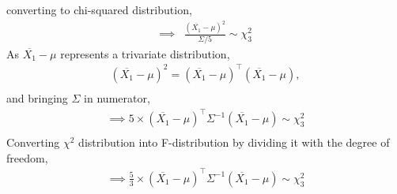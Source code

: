 \documentclass[journal,12pt,twocolumn]{IEEEtran}
\theoremstyle{remark}
\begin{document}
converting to chi-squared distribution,
\begin{align}
	\implies &\frac{(\overline{X_1} - \mu)^2}{\Sigma/5} \sim \chi^2_3
\end{align}
As $\overline{X_1}-\mu$ represents a trivariate distribution, 
\begin{align}
	(\overline{X_1}-\mu)^2 = (\overline{X_1}-\mu)^{\top}(\overline{X_1}-\mu),\\
\end{align}
and bringing $\Sigma$ in numerator,
\begin{align}
	\implies 5 \times (\overline{X_1}-\mu)^{\top}\Sigma^{-1}(\overline{X_1}-\mu) \sim \chi^2_3\\
\end{align}
Converting $\chi^2$ distribution into F-distribution by dividing it with the degree of freedom,
\begin{align}
	\implies \frac{5}{3} \times (\overline{X_1}-\mu)^{\top}\Sigma^{-1}(\overline{X_1}-\mu) \sim \chi^2_3\\
\end{align}
\end{document}
